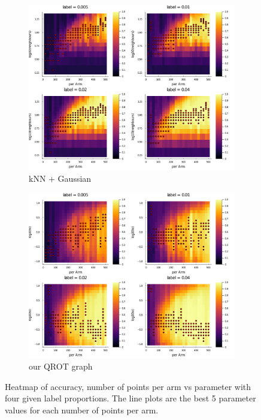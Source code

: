\documentclass{article}
\begin{document}
\begin{figure}[H]
    \centering
    \begin{subfigure}{0.45\textwidth}
    \includegraphics[width=\textwidth]{LaTeX/figures/KNN_max5.png}
    \caption{kNN + Gaussian}
    \end{subfigure}
    \begin{subfigure}{0.45\textwidth}
    \includegraphics[width=\textwidth]{LaTeX/figures/QOT_max5.png}
    \caption{our QROT graph}
    \end{subfigure}
    \caption{Heatmap of accuracy, number of points per arm vs parameter with four given label proportions. The line plots are the best 5 parameter values for each number of points per arm.}
    \label{fig:arm_vs_param}
\end{figure}
\end{document}
